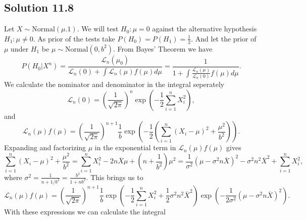 \subsection*{Solution 11.8}

Let $X \sim \mathrm{Normal}(\mu. 1)$.
We will test $H_0: \mu = 0$ against the alternative hypothesis $H_1: \mu \neq 0$.
As prior of the tests take $P(H_0) = P(H_1) = \frac{1}{2}$.
And let the prior of $\mu$ under $H_1$ be $\mu \sim \mathrm{Normal}(0, b^2)$.
From Bayes' Theorem we have
\begin{equation*}
    P(H_0|X^n) = \frac{\mathcal{L}_n(\mu_0)}{\mathcal{L}_n(0) + \int \mathcal{L}_n(\mu) f(\mu) d\mu}
        = \frac{1}{1 + \int \frac{\mathcal{L}_n(\mu)}{\mathcal{L}_n(0)} f(\mu) d\mu}.
\end{equation*}
We calculate the nominator and denominator in the integral seperately
\begin{equation*}
    \mathcal{L}_n(0)
        = \left(\frac{1}{\sqrt{2\pi}}\right)^n \exp\left(-\frac{1}{2}\sum_{i = 1}^n X_i^2\right),
\end{equation*}
and
\begin{equation*}
    \mathcal{L}_n(\mu) f(\mu)
        = \left(\frac{1}{\sqrt{2\pi}}\right)^{n + 1} \frac{1}{b}
            \exp\left(-\frac{1}{2}\left(\sum_{i = 1}^n (X_i - \mu)^2 + \frac{\mu^2}{b^2}\right)\right).
\end{equation*}
Expanding and factorizing $\mu$ in the exponential term in $\mathcal{L}_n(\mu) f(\mu)$ gives
\begin{equation*}
    \sum_{i = 1}^n (X_i - \mu)^2 + \frac{\mu^2}{b^2}
        = \sum_{i = 1}^n X_i^2 - 2n \overline{X} \mu + \left(n + \frac{1}{b^2}\right)\mu^2
        = \frac{1}{\sigma^2}\left(\mu - \sigma^2 n \overline{X}\right)^2 - \sigma^2 n^2 \overline{X}^2 + \sum_{i = 1}^n X_i^2,
\end{equation*}
where $\sigma^2 = \frac{1}{n + 1/b^2} = \frac{b^2}{1 + nb^2}$.
This brings us to
\begin{equation*}
    \mathcal{L}_n(\mu) f(\mu)
        = \left(\frac{1}{\sqrt{2\pi}}\right)^{n + 1} \frac{1}{b}
            \exp\left(-\frac{1}{2}\sum_{i = 1}^n X_i^2 + \frac{1}{2}\sigma^2 n^2 \overline{X}^2 \right)
            \exp\left(-\frac{1}{2\sigma^2} \left(\mu - \sigma^2 n \overline{X}\right)^2\right).
\end{equation*}
With these expressions we can calculate the integral
